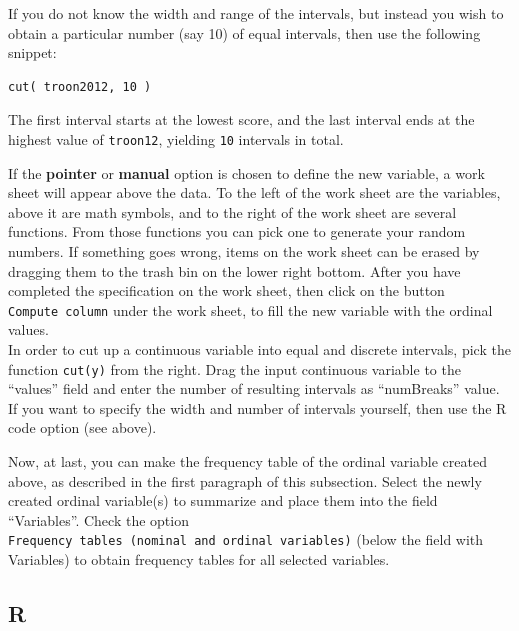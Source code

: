 \documentclass[
]{book}
\newenvironment{Shaded}{\begin{snugshade}}{\end{snugshade}}
\newcommand{\AttributeTok}[1]{\textcolor[rgb]{0.13,0.29,0.53}{#1}}
\newcommand{\ConstantTok}[1]{\textcolor[rgb]{0.56,0.35,0.01}{#1}}
\newcommand{\FunctionTok}[1]{\textcolor[rgb]{0.13,0.29,0.53}{\textbf{#1}}}
\newcommand{\NormalTok}[1]{#1}
\newcommand{\OtherTok}[1]{\textcolor[rgb]{0.56,0.35,0.01}{#1}}
\newcommand{\SpecialCharTok}[1]{\textcolor[rgb]{0.81,0.36,0.00}{\textbf{#1}}}
\newcommand{\StringTok}[1]{\textcolor[rgb]{0.31,0.60,0.02}{#1}}
\begin{document}
If you do not know the width and range of the intervals, but instead you wish to obtain a particular number (say 10) of equal intervals, then use the following snippet:

\begin{verbatim}
cut( troon2012, 10 ) 
\end{verbatim}

The first interval starts at the lowest score, and the last interval ends at the highest value of \texttt{troon12}, yielding \texttt{10} intervals in total.

If the \textbf{pointer} or \textbf{manual} option is chosen to define the new variable, a work sheet will appear above the data. To the left of the work sheet are the variables, above it are math symbols, and to the right of the work sheet are several functions. From those functions you can pick one to generate your random numbers. If something goes wrong, items on the work sheet can be erased by dragging them to the trash bin on the lower right bottom. After you have completed the specification on the work sheet, then click on the button \texttt{Compute\ column} under the work sheet, to fill the new variable with the ordinal values.\\
In order to cut up a continuous variable into equal and discrete intervals, pick the function \texttt{cut(y)} from the right. Drag the input continuous variable to the ``values'' field and enter the number of resulting intervals as ``numBreaks'' value. If you want to specify the width and number of intervals yourself, then use the R code option (see above).

Now, at last, you can make the frequency table of the ordinal variable created above, as described in the first paragraph of this subsection. Select the newly created ordinal variable(s) to summarize and place them into the field ``Variables''. Check the option \texttt{Frequency\ tables\ (nominal\ and\ ordinal\ variables)} (below the field with Variables) to obtain frequency tables for all selected variables.

\hypertarget{r-1}{%
\subsection{R}\label{r-1}}

\begin{Shaded}
\end{Shaded}
\end{document}
